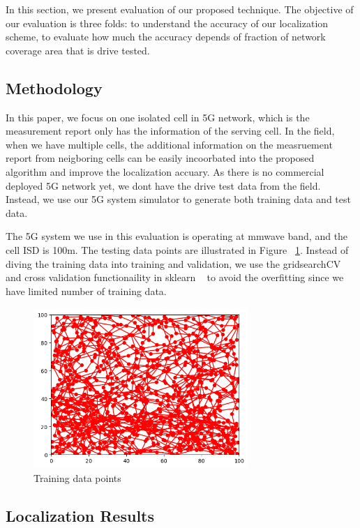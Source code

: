 \documentclass[conference, 10pt]{IEEEtran}
\begin{document}
In this section, we present evaluation of our proposed technique. The objective of
our evaluation is three folds: to understand the accuracy of our localization scheme, to evaluate
how much the accuracy depends of fraction of network coverage area that is drive
tested.

\subsection{Methodology}
In this paper, we focus on one isolated cell in 5G network, which is the measurement report
only has the information of the serving cell. In the field, when we have multiple cells, the additional
information on the measruement report from neigboring cells can be easily incoorbated into the proposed algorithm and improve the 
localization accuary. As there is no commercial deployed 5G network yet, we dont have the drive test data from the field.
Instead, we use our 5G system simulator to generate both training data and test data.

The 5G system we use in this evaluation is operating at mmwave band, and the cell ISD is 100m. The testing data points are illustrated in 
Figure ~\ref{fig:training}. Instead of diving the training data into training and validation, we use the gridsearchCV and cross validation functionaility in 
sklearn ~\cite{sklearn} to avoid the overfitting since we have limited number of training data.

\begin{figure}[t]
	\begin{center}
	\includegraphics[height=2.4in,width=3.2in]{./GM_training.png}
	\caption{\label{fig:training}
	{\small Training data points}}
	\end{center}
	\end{figure}		

\subsection{Localization Results}
\end{document}
